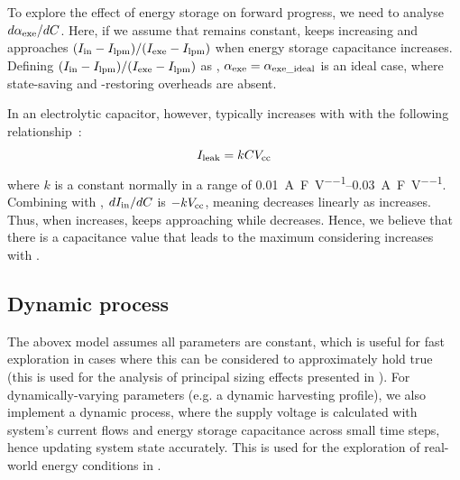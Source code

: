 To explore the effect of energy storage on forward progress, we need to analyse $d\alpha_{\text{exe}} / dC$. 
Here, if we assume that  remains constant,  keeps increasing and approaches $(I_{\text{in}} - I_{\text{lpm}}) / (I_{\text{exe}} - I_{\text{lpm}})$ when energy storage capacitance  increases. 
Defining $(I_{\text{in}} - I_{\text{lpm}}) / (I_{\text{exe}} - I_{\text{lpm}})$ as , $\alpha_{\text{exe}} = \alpha_{\text{exe\_ideal}}$ is an ideal case, where state-saving and -restoring overheads are absent.

In an electrolytic capacitor, however,  typically increases with  with the following relationship~\cite{avxleakage}:
\begin{equation}
    I_{\text{leak}} = kCV_{\text{cc}}
    \label{eq:ileak}
\end{equation}
where $k$ is a constant normally in a range of \SIrange{0.01}{0.03}{\ampere\per\farad\per\volt}. 
Combining  with , $dI_{\text{in}} / dC$ is $-kV_{\text{cc}}$, meaning  decreases linearly as  increases. 
Thus, when  increases,  keeps approaching  while  decreases. 
Hence, we believe that there is a capacitance value that leads to the maximum  considering  increases with .

\subsection{Dynamic process}

The abovex model assumes all parameters are constant, which is useful for fast exploration in cases where this can be considered to approximately hold true (this is used for the analysis of principal sizing effects presented in ).
For dynamically-varying parameters (e.g. a dynamic harvesting profile), we also implement a dynamic process, where the supply voltage is calculated with system's current flows and energy storage capacitance across small time steps, hence updating system state accurately. 
This is used for the exploration of real-world energy conditions in .
